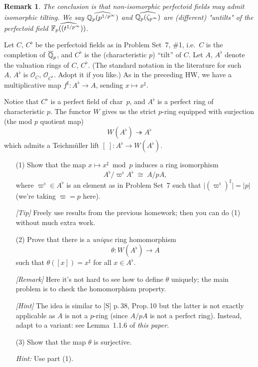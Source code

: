 \documentclass[12pt]{article}  %
\newtheorem{remark}{Remark}
\begin{document}
\begin{remark}
    The conclusion is that non-isomorphic perfectoid fields may admit
isomorphic tilting. We say $\widehat{\mathbb{Q}_p(p^{1/p^\infty})}$ and $\widehat{\mathbb{Q}_p(\zeta_{p^\infty})}$
are (different) "untilts" of the perfectoid field $\widehat{\mathbb{F}_p((t^{1/p^\infty}))}$.

\end{remark}

\begin{problem}[2]
Let $C,\,C^\flat$ be the perfectoid fields as in Problem Set~7, \#1,
i.e.\ $C$ is the completion of $\overline{\mathbb{Q}}_p$, and $C^\flat$ is the
(characteristic $p$) ``tilt'' of $C$.
Let $A,\,A^\flat$ denote the valuation rings of $C,\,C^\flat$.
(The standard notation in the literature for such $A,\,A^\flat$ is
$\mathcal O_C,\,\mathcal O_{C^\flat}$. Adopt it if you like.)
As in the preceding HW, we have a multiplicative map
$f^\sharp:A^\flat\to A$, sending $x\mapsto x^\sharp$.

Notice that $C^\flat$ is a perfect field of char~$p$, and $A^\flat$ is a perfect ring
of characteristic $p$. The functor $W$ gives us the strict $p$-ring equipped with
surjection (the mod $p$ quotient map)
\[
  W(A^\flat)\twoheadrightarrow A^\flat
\]
which admits a Teichmüller lift $[\;]:A^\flat\to W(A^\flat)$.

\begin{enumerate}
  \item[(1)] Show that the map $x\mapsto x^\sharp \bmod p$ induces a ring isomorphism
  \[
    A^\flat/\varpi^\flat A^\flat \;\cong\; A/pA,
  \]
  where $\varpi^\flat\in A^\flat$ is an element as in Problem Set~7 such that
  $\lvert(\varpi^\flat)^\sharp\rvert=\lvert p\rvert$ (we’re taking $\varpi=p$ here).

  \emph{[Tip]} Freely use results from the previous homework; then you can do (1)
  without much extra work.

  \item[(2)] Prove that there is a \emph{unique} ring homomorphism
  \[
    \theta: W(A^\flat)\longrightarrow A
  \]
  such that $\theta([x])=x^\sharp$ for all $x\in A^\flat$.

  \emph{[Remark]} Here it’s not hard to see how to define $\theta$ uniquely; the main
  problem is to check the homomorphism property.

  \emph{[Hint]} The idea is similar to [S] p.\,38, Prop.\,10 but the latter is not exactly
  applicable as $A$ is not a $p$-ring (since $A/pA$ is not a perfect ring). Instead,
  adapt to a variant: see Lemma~1.1.6 of \emph{this paper}.

  \item[(3)] Show that the map $\theta$ is surjective.

  \emph{Hint:} Use part (1).
\end{enumerate}
\end{problem}
\end{document}
